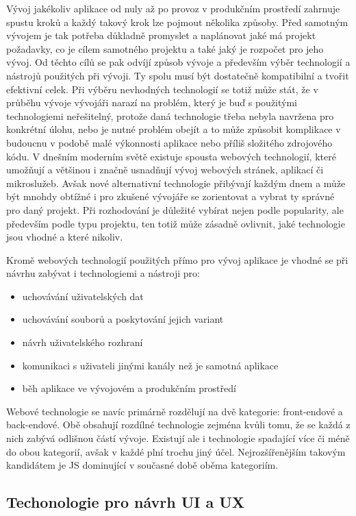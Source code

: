 Vývoj jakékoliv aplikace od nuly až po provoz v produkčním prostředí zahrnuje spustu kroků a každý takový krok
lze pojmout několika způsoby.
Před samotným vývojem je tak potřeba důkladně promyslet a naplánovat jaké má projekt požadavky, co je cílem samotného projektu
a také jaký je rozpočet pro jeho vývoj.
Od těchto cílů se pak odvíjí způsob vývoje a především výběr technologií a nástrojů použitých při vývoji.
Ty spolu musí být dostatečně kompatibilní a tvořit efektivní celek.
Při výběru nevhodných technologií se totiž může stát, že v průběhu vývoje vývojáři narazí na problém, který je buď
s použitými technologiemi neřešitelný, protože daná technologie třeba nebyla navržena pro konkrétní úlohu, nebo
je nutné problém obejít a to může způsobit komplikace v budoucnu v podobě malé výkonnosti aplikace nebo příliš
složitého zdrojového kódu.
V dnešním moderním světě existuje spousta webových technologií, které umožňují a většinou i značně usnadňují vývoj
webových stránek, aplikací či mikroslužeb.
Avšak nové alternativní technologie přibývají každým dnem a může být mnohdy obtížné i pro zkušené
vývojáře se zorientovat a vybrat ty správné pro daný projekt.
Při rozhodování je důležité vybírat nejen podle popularity, ale především podle typu projektu, ten totiž může zásadně
ovlivnit, jaké technologie jsou vhodné a které nikoliv.

Kromě webových technologií použitých přímo pro vývoj aplikace je vhodné se při návrhu zabývat i technologiemi a nástroji
pro:
\begin{itemize}
	\item uchovávání uživatelských dat
	\item uchovávání souborů a poskytování jejich variant
	\item návrh uživatelského rozhraní
	\item komunikaci s uživateli jinými kanály než je samotná aplikace
	\item běh aplikace ve vývojovém a produkčním prostředí
\end{itemize}

Webové technologie se navíc primárně rozdělují na dvě kategorie: front-endové a back-endové.
Obě obsahují rozdílné technologie zejména kvůli tomu, že se každá z nich zabývá odlišnou částí
vývoje.
Existují ale i technologie spadající více či méně do obou kategorií, avšak v každé plní trochu jiný účel.
Nejrozšířenějším takovým kandidátem je \noindent\ac{JS} dominující v současné době oběma kategoriím.

	\subsection{Techonologie pro návrh UI a UX}

